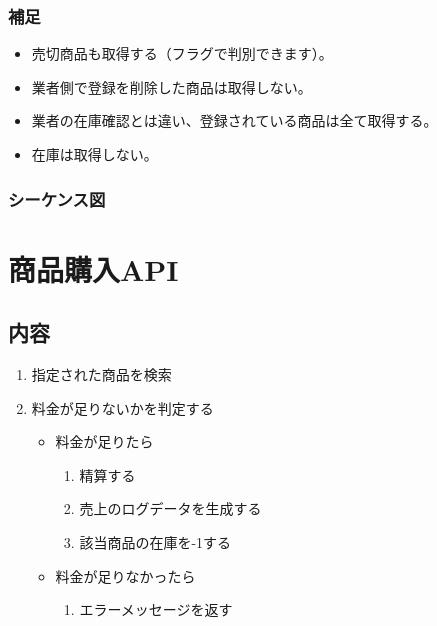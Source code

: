 \documentclass[letterpaper,10pt,dvipdfmx]{sphinxmanual}
\begin{document}
\subsection{補足}
\label{\detokenize{user/index:id5}}\begin{itemize}
\item {} 
売切商品も取得する（フラグで判別できます）。

\item {} 
業者側で登録を削除した商品は取得しない。

\item {} 
業者の在庫確認とは違い、登録されている商品は全て取得する。

\item {} 
在庫は取得しない。

\end{itemize}
\clearpage

\subsection{シーケンス図}
\label{\detokenize{user/index:id6}}
\noindent{}


\chapter{商品購入API}
\label{\detokenize{user/buy:api}}\label{\detokenize{user/buy::doc}}

\section{内容}
\label{\detokenize{user/buy:id1}}\begin{enumerate}
\item {} 
指定された商品を検索

\item {} 
料金が足りないかを判定する
\begin{itemize}
\item {} 
料金が足りたら
\begin{enumerate}
\item {} 
精算する

\item {} 
売上のログデータを生成する

\item {} 
該当商品の在庫を-1する

\end{enumerate}

\item {} 
料金が足りなかったら
\begin{enumerate}
\item {} 
エラーメッセージを返す

\end{enumerate}

\end{itemize}

\end{enumerate}
\end{document}
